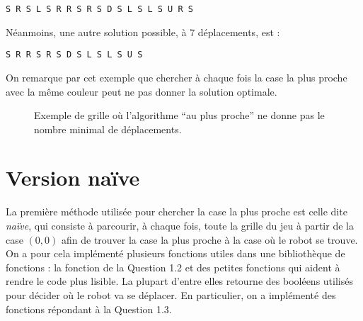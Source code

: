\documentclass[a4paper,12pt]{article}
\numberwithin{equation}{section}
\begin{document}
\texttt{S R S L S R R S R S D S L S L S U R S}

Néanmoins, une autre solution possible, à 7 déplacements, est :

\texttt{S R R S R S D S L S L S U S}

On remarque par cet exemple que chercher à chaque fois la case la plus proche avec la même couleur peut ne pas donner la solution optimale.

\begin{figure}[ht]
\centering
{}
\caption{Exemple de grille où l'algorithme ``au plus proche'' ne donne pas le nombre minimal de déplacements.}
\label{FigExpl}
\end{figure}

\section{Version naïve}

La première méthode utilisée pour chercher la case la plus proche est celle dite \emph{naïve}, qui consiste à parcourir, à chaque fois, toute la grille du jeu à partir de la case $(0, 0)$ afin de trouver la case la plus proche à la case où le robot se trouve. On a pour cela implémenté plusieurs fonctions utiles dans une bibliothèque de fonctions : la fonction \verb@PlusCourtChemin@ de la Question 1.2 et des petites fonctions qui aident à rendre le code plus lisible. La plupart d'entre elles retourne des booléens utilisés pour décider où le robot va se déplacer. En particulier, on a implémenté des fonctions répondant à la Question 1.3.
\end{document}
